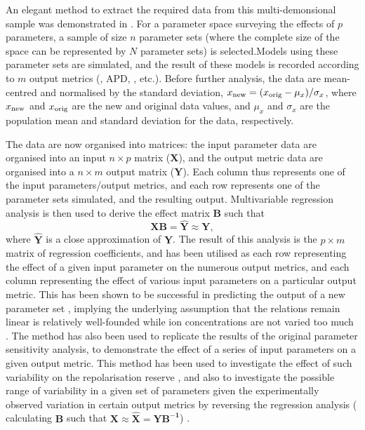 \documentclass[../thesis-main.tex]{subfiles}
\begin{document}
 An elegant method to extract the required data from this multi-demonsional sample was demonstrated in \citet{Sobie2009}. For a parameter space surveying the effects of $p$ parameters, a sample of size $n$ parameter sets (where the complete size of the space can be represented by $N$ parameter sets) is selected.Models using these parameter sets are simulated, and the result of these models is recorded according to $m$ output metrics (\eg{}, APD, \casys{}, etc.). Before further analysis, the data are mean-centred and normalised by the standard deviation, \idest{} $x_\textnormal{new} = (x_\textnormal{orig}-\mu_x)/\sigma_x$, where $x_\textnormal{new}$ and $x_\textnormal{orig}$ are the new and original data values, and $\mu_x$ and $\sigma_x$ are the population mean and standard deviation for the data, respectively.
 
 The data are now organised into matrices: the input parameter data are organised into an input $n\times p$ matrix ($\mathbf{X}$), and the output metric data are organised into a $n\times m$ output matrix ($\mathbf{Y}$). Each column thus represents one of the input parameters/output metrics, and each row represents one of the parameter sets simulated, and the resulting output. Multivariable regression analysis is then used to derive the effect matrix $\mathbf{B}$ such that
 \begin{equation}
  \mathbf{XB} = \mathbf{\hat{Y}} \approx \mathbf{Y},
 \end{equation}
 where $\mathbf{\hat{Y}}$ is a close approximation of $\mathbf{Y}$. The result of this analysis is the $p\times m$ matrix of regression coefficients, and has been utilised as each row representing the effect of a given input parameter on the numerous output metrics, and each column representing the effect of various input parameters on a particular output metric. This has been shown to be successful in predicting the output of a new parameter set \citep{Sobie2009}, implying the underlying assumption that the relations remain linear is relatively well-founded while ion concentrations are not varied too much \citep{Sobie2009, Sarkar2010}. The method has also been used to replicate the results of the original parameter sensitivity analysis, \idest{} to demonstrate the effect of a series of input parameters on a given output metric. This method has been used to investigate the effect of such variability on the repolarisation reserve \citep{Sarkar2011}, and also to investigate the possible range of variability in a given set of parameters given the experimentally observed variation in certain output metrics by reversing the regression analysis (\idest{} calculating $\mathbf{B}$ such that $\mathbf{X} \approx \mathbf{\hat{X}} = \mathbf{YB^{-1}}$) \citep{Sarkar2010}.
 
\end{document}
